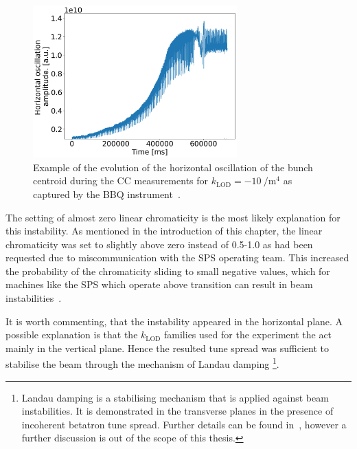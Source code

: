 \begin{figure}[!h]
   \centering         
   \includegraphics[width=0.7\textwidth]{images/Ch8/2022.05.16.17.49.04.430450.png}
       \caption{Example of the evolution of the horizontal oscillation of the bunch centroid during the CC measurements for $k_\mathrm{LOD}=-10 \ \mathrm{/m^4}$ as captured by the BBQ instrument~\cite{Boccardi:1055568}.}
       \label{fig:instability_BBQ_klod-15_4may2022}
\end{figure}


The setting of almost zero linear chromaticity is the most likely explanation for this instability. As mentioned in the introduction of this chapter, the linear chromaticity was set to slightly above zero instead of 0.5-1.0 as had been requested due to miscommunication with the SPS operating team. This increased the probability of the chromaticity sliding to small negative values, which for machines like the SPS which operate above transition can result in beam instabilities~\cite{collective_effects_cas_li}.


It is worth commenting, that the instability appeared in the horizontal plane. A possible explanation is that the $k_\mathrm{LOD}$ families used for the experiment the act mainly in the vertical plane. Hence the resulted tune spread was sufficient to stabilise the beam through the mechanism of Landau damping \footnote{Landau damping is a stabilising mechanism that is applied against beam instabilities. It is demonstrated in the transverse planes in the presence of incoherent betatron tune spread. Further details can be found in~\cite{Herr:1982428, Schenk:2665819}, however a further discussion is out of the scope of this thesis.}.

